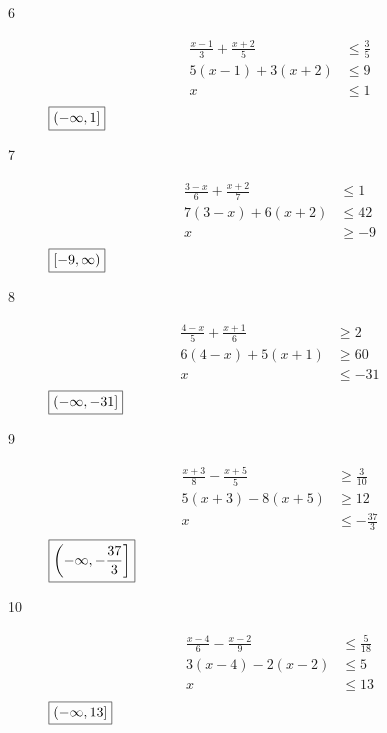 \documentclass[letterpaper, landscape]{exam}
\begin{document}
\begin{description}
      \item[6]
        \begin{align*}
          \frac{x-1}{3} + \frac{x+2}{5} & \leq \frac{3}{5} \\
          5 (x - 1) + 3(x + 2)          & \leq 9 \\
          x                             & \leq 1 \\
        \end{align*}
        $\boxed{ \intoc{ -\infty, 1 } }$

      \item[7]
        \begin{align*}
          \frac{3 - x}{6} + \frac{x + 2}{7} & \leq 1 \\
          7 (3 - x) + 6(x + 2)              & \leq 42 \\
          x                                 & \geq -9 \\
        \end{align*}
        $\boxed{ \intco{ -9, \infty } }$

      \item[8]
        \begin{align*}
          \frac{4 - x}{5} + \frac{x + 1}{6} & \geq 2 \\
          6 (4 - x) + 5(x + 1)              & \geq 60 \\
          x                                 & \leq -31 \\
        \end{align*}
        $\boxed{ \intoc{ -\infty, -31 } }$

      \item[9]
        \begin{align*}
          \frac{x + 3}{8} - \frac{x + 5}{5} & \geq \frac{3}{10} \\
          5(x + 3) - 8(x + 5)               & \geq 12 \\
          x                                 & \leq - \frac{37}{3} \\
        \end{align*}
        $\boxed{ \intoc{ -\infty, - \frac{37}{3} } }$

      \newpage

      \item[10]
        \begin{align*}
          \frac{x - 4}{6} - \frac{x - 2}{9} & \leq \frac{5}{18} \\
          3(x - 4) - 2(x - 2)               & \leq 5 \\
          x                                 & \leq 13 \\
        \end{align*}
        $\boxed{ \intoc{ -\infty, 13 } }$


\end{description}
\end{document}
